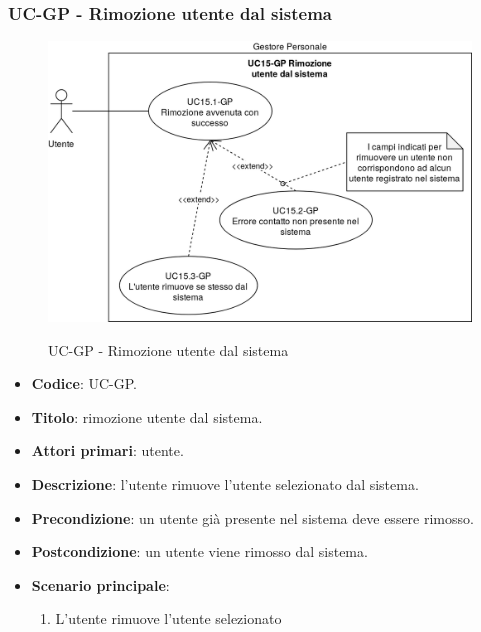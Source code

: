 \subsubsection{UC\theuccount-GP - Rimozione utente dal sistema}
		\begin{figure}[H]
			\centering
				\includegraphics[width=\columnwidth]{img/casi_d'uso/UC15.png}\\
			\caption{UC\theuccount-GP - Rimozione utente dal sistema}
		\end{figure}
	\begin{itemize}
		\item \textbf{Codice}: UC\theuccount-GP.
		\item \textbf{Titolo}: rimozione utente dal sistema.
		\item \textbf{Attori primari}: utente.
		\item \textbf{Descrizione}: l'utente rimuove l'utente selezionato dal sistema.
		\item \textbf{Precondizione}: un utente già presente nel sistema deve essere rimosso.
		\item \textbf{Postcondizione}: un utente viene rimosso dal sistema.
		\item \textbf{Scenario principale}:
		\begin{enumerate}
			\item L'utente rimuove l'utente selezionato
		\end{enumerate}
\end{itemize}
	
